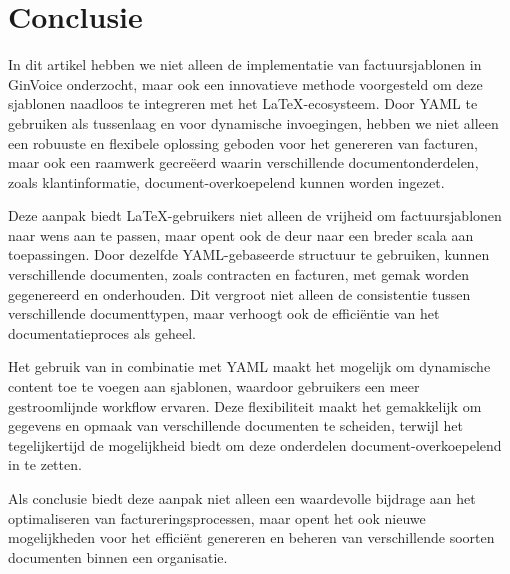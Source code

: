 \section{Conclusie}\label{sec:conclusie}
In dit artikel hebben we niet alleen de implementatie van factuursjablonen in GinVoice onderzocht, maar ook een innovatieve methode voorgesteld om deze sjablonen naadloos te integreren met het \LaTeX-ecosysteem.
Door YAML te gebruiken als tussenlaag en  voor dynamische invoegingen, hebben we niet alleen een robuuste en flexibele oplossing geboden voor het genereren van facturen, maar ook een raamwerk gecreëerd waarin verschillende documentonderdelen, zoals klantinformatie, document-overkoepelend kunnen worden ingezet.

Deze aanpak biedt \LaTeX-gebruikers niet alleen de vrijheid om factuursjablonen naar wens aan te passen, maar opent ook de deur naar een breder scala aan toepassingen.
Door dezelfde YAML-gebaseerde structuur te gebruiken, kunnen verschillende documenten, zoals contracten en facturen, met gemak worden gegenereerd en onderhouden.
Dit vergroot niet alleen de consistentie tussen verschillende documenttypen, maar verhoogt ook de efficiëntie van het documentatieproces als geheel.

Het gebruik van  in combinatie met YAML maakt het mogelijk om dynamische content toe te voegen aan sjablonen, waardoor gebruikers een meer gestroomlijnde workflow ervaren.
Deze flexibiliteit maakt het gemakkelijk om gegevens en opmaak van verschillende documenten te scheiden, terwijl het tegelijkertijd de mogelijkheid biedt om deze onderdelen document-overkoepelend in te zetten.

Als conclusie biedt deze aanpak niet alleen een waardevolle bijdrage aan het optimaliseren van factureringsprocessen, maar opent het ook nieuwe mogelijkheden voor het efficiënt genereren en beheren van verschillende soorten documenten binnen een organisatie.
